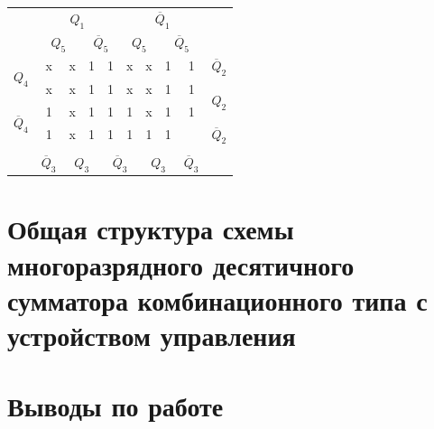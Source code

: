 \documentclass[a4paper,14pt]{article}
\begin{document}
\begin{table}[H]
\begin{minipage}{.5\linewidth}
\begin{tabular}{cccccccccc}
\end{tabular}
	\end{minipage}%
	\begin{minipage}{.5\linewidth}
		\centering
\begin{tabular}{cccccccccc}
	& \multicolumn{4}{c}{$Q_1$}                                                                         & \multicolumn{4}{c}{$\overline{Q}_1$}                                                              &                        \\
	& \multicolumn{2}{c}{$Q_5$}                       & \multicolumn{2}{c}{$\overline{Q}_5$}            & \multicolumn{2}{c}{$Q_5$}                       & \multicolumn{2}{c}{$\overline{Q}_5$}            &                        \\ \cline{2-9}
	\multicolumn{1}{c|}{\multirow{2}{*}{$Q_4$}}            & \multicolumn{1}{c|}{x} & \multicolumn{1}{c|}{x} & \multicolumn{1}{c|}{1} & \multicolumn{1}{c|}{1} & \multicolumn{1}{c|}{x} & \multicolumn{1}{c|}{x} & \multicolumn{1}{c|}{1} & \multicolumn{1}{c|}{1} & $\overline{Q}_2$       \\ \cline{2-9}
	\multicolumn{1}{c|}{}                                  & \multicolumn{1}{c|}{x} & \multicolumn{1}{c|}{x} & \multicolumn{1}{c|}{1} & \multicolumn{1}{c|}{1} & \multicolumn{1}{c|}{x} & \multicolumn{1}{c|}{x} & \multicolumn{1}{c|}{1} & \multicolumn{1}{c|}{1} & \multirow{2}{*}{$Q_2$} \\ \cline{2-9}
	\multicolumn{1}{c|}{\multirow{2}{*}{$\overline{Q}_4$}} & \multicolumn{1}{c|}{1} & \multicolumn{1}{c|}{x} & \multicolumn{1}{c|}{1} & \multicolumn{1}{c|}{1} & \multicolumn{1}{c|}{1} & \multicolumn{1}{c|}{x} & \multicolumn{1}{c|}{1} & \multicolumn{1}{c|}{1} &                        \\ \cline{2-9}
	\multicolumn{1}{c|}{}                                  & \multicolumn{1}{c|}{1} & \multicolumn{1}{c|}{x} & \multicolumn{1}{c|}{1} & \multicolumn{1}{c|}{1} & \multicolumn{1}{c|}{1} & \multicolumn{1}{c|}{1} & \multicolumn{1}{c|}{1} & \multicolumn{1}{c|}{}  & $\overline{Q}_2$       \\ \cline{2-9}
	&                        & \multicolumn{2}{c}{}                            & \multicolumn{2}{c}{}                            & \multicolumn{2}{c}{}                            &                        &                        \\
	& $\overline{Q}_3$       & \multicolumn{2}{c}{$Q_3$}                       & \multicolumn{2}{c}{$\overline{Q}_3$}            & \multicolumn{2}{c}{$Q_3$}                       & $\overline{Q}_3$       &                       
\end{tabular}
	\end{minipage} 
\end{table}
\section{Общая структура схемы многоразрядного десятичного сумматора комбинационного типа с устройством управления}

\section{Выводы по работе}
\end{document}
